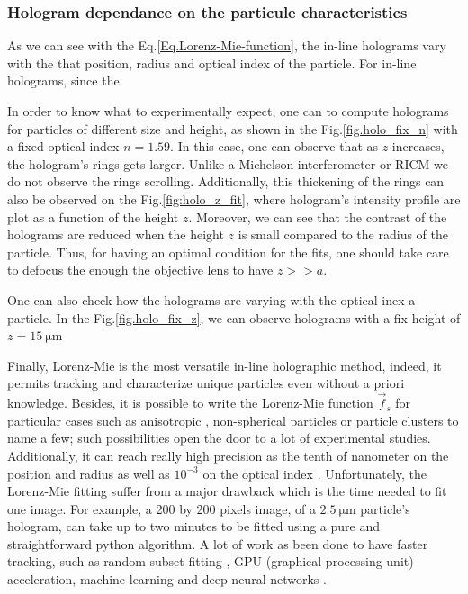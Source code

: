 \subsubsection{Hologram dependance on the particule characteristics}

As we can see with the Eq.\ref{Eq.Lorenz-Mie-function}, the in-line holograms vary with the that position, radius and optical index of the particle. For in-line holograms, since the 

In order to know what to experimentally expect, one can to compute holograms for particles of different size and height, as shown in the Fig.\ref{fig.holo_fix_n} with a fixed optical index $n = 1.59$. In this case, one can observe that as $z$ increases, the hologram's rings gets larger. Unlike a Michelson interferometer or \gls{RICM} we do not observe the rings scrolling. Additionally, this thickening of the rings can also be observed on the Fig.\ref{fig:holo_z_fit}, where hologram's intensity profile are plot as a function of the height $z$. Moreover, we can see that the contrast of the holograms are reduced when the height $z$ is small compared to the radius of the particle. Thus, for having an optimal condition for the fits, one should take care to defocus the enough the objective lens to have $z >> a$.

One can also check how the holograms are varying with the optical inex a particle. In the Fig.\ref{fig.holo_fix_z}, we can observe holograms with a fix height of $z=15 ~ \mathrm{\mu m}$ 


Finally, Lorenz-Mie is the most versatile in-line holographic method, indeed, it permits tracking and characterize unique particles even without a priori knowledge. Besides, it is possible to write the Lorenz-Mie function $\vec{f}_s$ for particular cases such as anisotropic \cite{fung_holographic_2013}, non-spherical particles \cite{wang_using_2014} or particle clusters \cite{fung_holographic_2013, perry_real-space_2013} to name a few; such possibilities open the door to a lot of experimental studies. Additionally, it can reach really high precision as the tenth of nanometer on the position and radius as well as $10^{-3}$ on the optical index \cite{lee_characterizing_2007}. Unfortunately, the Lorenz-Mie fitting suffer from a major drawback which is the time needed to fit one image. For example, a 200 by 200 pixels image, of a $2.5 ~ \mathrm{\mu m}$ particle's hologram, can take up to two minutes to be fitted using a pure and straightforward python algorithm. A lot of work as been done to have faster tracking, such as random-subset fitting \cite{dimiduk_random-subset_2014}, GPU (graphical processing unit) acceleration, machine-learning \cite{yevick_machine-learning_2014, hannel_machine-learning_2018} and deep neural networks \cite{altman_catch_2020}.

